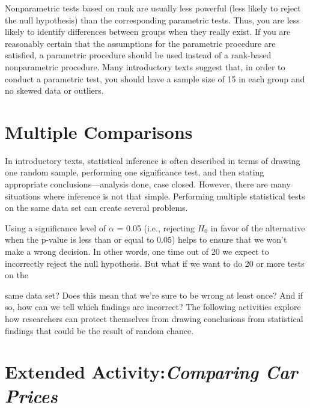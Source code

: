 \documentclass[
]{report}
\begin{document}
\normalsize

Nonparametric tests based on rank are usually less powerful (less likely to reject the null hypothesis) than the corresponding parametric tests. Thus, you are less likely to identify differences between groups when they really exist. If you are reasonably certain that the assumptions for the parametric procedure are satisfied, a parametric procedure should be used instead of a rank-based nonparametric procedure. Many introductory texts suggest that, in order to conduct a parametric test, you should have a sample size of 15 in each group and no skewed data or outliers.

\section{\texorpdfstring{\textbf{Multiple Comparisons}}{Multiple Comparisons}}\label{multiple-comparisons}

In introductory texts, statistical inference is often described in terms of drawing one random sample, performing one significance test, and then stating appropriate conclusions---analysis done, case closed. However, there are many situations where inference is not that simple. Performing multiple statistical tests on the same data set can create several problems.

Using a significance level of \(\alpha\) = 0.05 (i.e., rejecting \(H_0\) in favor of the alternative when the p-value is less than or equal to 0.05) helps to ensure that we won't make a wrong decision. In other words, one time out of 20 we expect to incorrectly reject the null hypothesis. But what if we want to do 20 or more tests on the

same data set? Does this mean that we're sure to be wrong at least once? And if so, how can we tell which findings are incorrect? The following activities explore how researchers can protect themselves from drawing conclusions from statistical findings that could be the result of random chance.

\section*{\texorpdfstring{Extended Activity:\emph{Comparing Car Prices}}{Extended Activity:Comparing Car Prices}}\label{extended-activitycomparing-car-prices}
\end{document}
